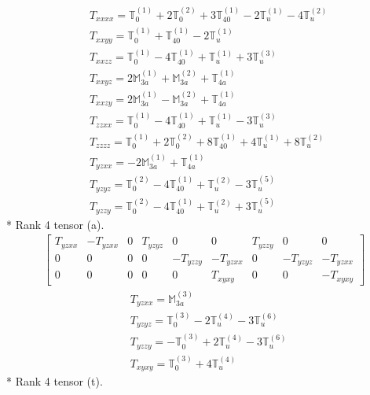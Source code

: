 \documentclass[fleqn,8pt,landscape]{jsarticle}
\begin{document}
\begin{align*}
& T_{xxxx} = \mathbb{T}_{0}^{(1)} + 2 \mathbb{T}_{0}^{(2)} + 3 \mathbb{T}_{40}^{(1)} - 2 \mathbb{T}_{u}^{(1)} - 4 \mathbb{T}_{u}^{(2)} \\
& T_{xxyy} = \mathbb{T}_{0}^{(1)} + \mathbb{T}_{40}^{(1)} - 2 \mathbb{T}_{u}^{(1)} \\
& T_{xxzz} = \mathbb{T}_{0}^{(1)} - 4 \mathbb{T}_{40}^{(1)} + \mathbb{T}_{u}^{(1)} + 3 \mathbb{T}_{u}^{(3)} \\
& T_{xxyz} = 2 \mathbb{M}_{3a}^{(1)} + \mathbb{M}_{3a}^{(2)} + \mathbb{T}_{4a}^{(1)} \\
& T_{xxzy} = 2 \mathbb{M}_{3a}^{(1)} - \mathbb{M}_{3a}^{(2)} + \mathbb{T}_{4a}^{(1)} \\
& T_{zzxx} = \mathbb{T}_{0}^{(1)} - 4 \mathbb{T}_{40}^{(1)} + \mathbb{T}_{u}^{(1)} - 3 \mathbb{T}_{u}^{(3)} \\
& T_{zzzz} = \mathbb{T}_{0}^{(1)} + 2 \mathbb{T}_{0}^{(2)} + 8 \mathbb{T}_{40}^{(1)} + 4 \mathbb{T}_{u}^{(1)} + 8 \mathbb{T}_{u}^{(2)} \\
& T_{yzxx} = - 2 \mathbb{M}_{3a}^{(1)} + \mathbb{T}_{4a}^{(1)} \\
& T_{yzyz} = \mathbb{T}_{0}^{(2)} - 4 \mathbb{T}_{40}^{(1)} + \mathbb{T}_{u}^{(2)} - 3 \mathbb{T}_{u}^{(5)} \\
& T_{yzzy} = \mathbb{T}_{0}^{(2)} - 4 \mathbb{T}_{40}^{(1)} + \mathbb{T}_{u}^{(2)} + 3 \mathbb{T}_{u}^{(5)}
\end{align*}
* Rank 4 tensor (a).
\begin{align*}
\begin{bmatrix} T_{yzxx} & - T_{yzxx} & 0 & T_{yzyz} & 0 & 0 & T_{yzzy} & 0 & 0 \\ 0 & 0 & 0 & 0 & - T_{yzzy} & - T_{yzxx} & 0 & - T_{yzyz} & - T_{yzxx} \\ 0 & 0 & 0 & 0 & 0 & T_{xyxy} & 0 & 0 & - T_{xyxy} \end{bmatrix}
\end{align*}
\begin{align*}
& T_{yzxx} = \mathbb{M}_{3a}^{(3)} \\
& T_{yzyz} = \mathbb{T}_{0}^{(3)} - 2 \mathbb{T}_{u}^{(4)} - 3 \mathbb{T}_{u}^{(6)} \\
& T_{yzzy} = - \mathbb{T}_{0}^{(3)} + 2 \mathbb{T}_{u}^{(4)} - 3 \mathbb{T}_{u}^{(6)} \\
& T_{xyxy} = \mathbb{T}_{0}^{(3)} + 4 \mathbb{T}_{u}^{(4)}
\end{align*}
* Rank 4 tensor (t).
\end{document}
